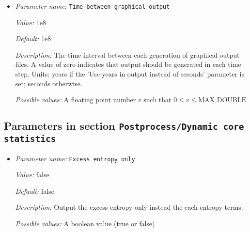 \begin{itemize}
{\it Default:} gnuplot


{\it Description:} The format in which the output shall be produced. The format in which the output is generated also determines the extension of the file into which data is written. The list of possible output formats that can be given here is documented in the appendix of the manual where the current parameter is described.


{\it Possible values:} Any one of none, dx, ucd, gnuplot, povray, eps, gmv, tecplot, tecplot\_binary, vtk, vtu, hdf5, svg, deal.II intermediate, txt
\item {\it Parameter name:} {\tt Time between graphical output}
\label{parameters:Postprocess/Depth average/Time between graphical output}


{\it Value:} 1e8


{\it Default:} 1e8


{\it Description:} The time interval between each generation of graphical output files. A value of zero indicates that output should be generated in each time step. Units: years if the 'Use years in output instead of seconds' parameter is set; seconds otherwise.


{\it Possible values:} A floating point number $v$ such that $0 \leq v \leq \text{MAX\_DOUBLE}$
\end{itemize}

\subsection{Parameters in section \tt Postprocess/Dynamic core statistics}
\label{parameters:Postprocess/Dynamic_20core_20statistics}

\begin{itemize}
\item {\it Parameter name:} {\tt Excess entropy only}
\label{parameters:Postprocess/Dynamic core statistics/Excess entropy only}


{\it Value:} false


{\it Default:} false


{\it Description:} Output the excess entropy only instead the each entropy terms.


{\it Possible values:} A boolean value (true or false)
\end{itemize}

